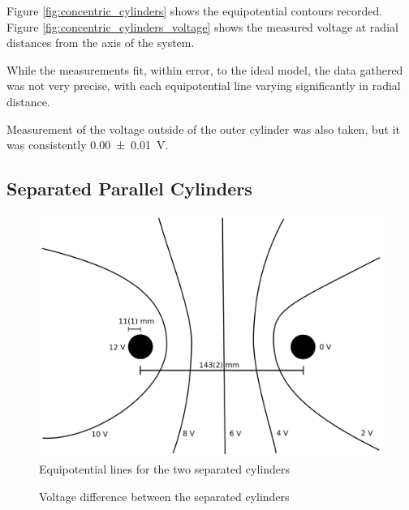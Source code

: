 \documentclass[a4paper]{scrartcl}
\begin{document}
Figure \ref{fig:concentric_cylinders} shows the equipotential contours recorded. Figure \ref{fig:concentric_cylinders_voltage} shows the measured voltage at radial distances from the axis of the system.

While the measurements fit, within error, to the ideal model, the data gathered was not very precise, with each equipotential line varying significantly in radial distance.

Measurement of the voltage outside of the outer cylinder was also taken, but it was consistently \SI{0.00 \pm 0.01}{\volt}.

\subsection{Separated Parallel Cylinders}
\begin{figure}
    \centering
    \includegraphics[width = 15cm]{lab2_separated_parallel_cylinders.png}
    \caption{Equipotential lines for the two separated cylinders}
    \label{fig:separated_parallel_cylinders}
\end{figure}
\begin{figure}
    \centering
    \caption{Voltage difference between the separated cylinders}
    \label{fig:separated_parallel_cylinders_voltage}
\end{figure}
\end{document}
